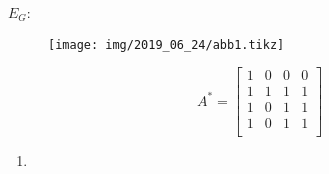 $E_G$:

\begin{figure}[H]
	\centering
	\texttt{[image: img/2019\_06\_24/abb1.tikz]}
\end{figure}

\begin{equation}
	A^\ast=
	\begin{bmatrix}
	1 & 0 & 0 & 0 \\
	1 & 1 & 1 & 1 \\
	1 & 0 & 1 & 1 \\
	1 & 0 & 1 & 1 \\
	\end{bmatrix}
\end{equation}


\begin{enumerate}[label=(\alph*)]
\item 
\end{enumerate}